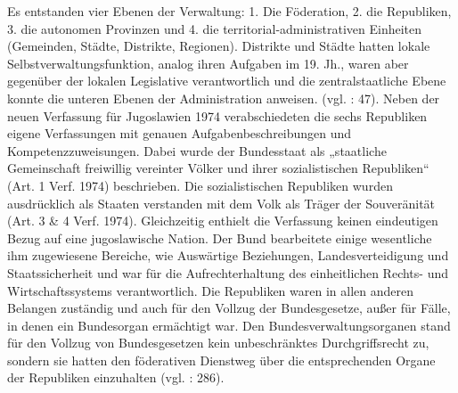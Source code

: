 Es entstanden vier Ebenen der Verwaltung: 1. Die Föderation, 2. die Republiken, 3. die autonomen Provinzen und 4. die territorial-administrativen Einheiten (Gemeinden, Städte, Distrikte, Regionen). Distrikte und Städte hatten lokale Selbstverwaltungsfunktion, analog ihren Aufgaben im 19. Jh., waren aber gegenüber der lokalen Legislative verantwortlich und die zentralstaatliche Ebene konnte die unteren Ebenen der Administration anweisen. (vgl. \cite{sevic}: 47). Neben der neuen Verfassung für Jugoslawien 1974 verabschiedeten die sechs Republiken eigene Verfassungen mit genauen Aufgabenbeschreibungen und Kompetenzzuweisungen. Dabei wurde der Bundesstaat als „staatliche Gemeinschaft freiwillig vereinter Völker und ihrer sozialistischen Republiken“ (Art. 1 Verf. 1974) beschrieben. Die sozialistischen Republiken wurden ausdrücklich als Staaten verstanden mit dem Volk als Träger der Souveränität (Art. 3 \& 4 Verf. 1974). Gleichzeitig enthielt die Verfassung keinen eindeutigen Bezug auf eine jugoslawische Nation. Der Bund bearbeitete einige wesentliche ihm zugewiesene Bereiche, wie Auswärtige Beziehungen, Landesverteidigung und Staatssicherheit und war für die Aufrechterhaltung des einheitlichen Rechts- und Wirtschaftssystems verantwortlich. Die Republiken waren in allen anderen Belangen zuständig und auch für den Vollzug der Bundesgesetze, außer für Fälle, in denen ein Bundesorgan ermächtigt war. Den Bundesverwaltungsorganen stand für den Vollzug von Bundesgesetzen kein unbeschränktes Durchgriffsrecht zu, sondern sie hatten den föderativen Dienstweg über die entsprechenden Organe der Republiken einzuhalten (vgl. \cite{roggemann}: 286).\par
